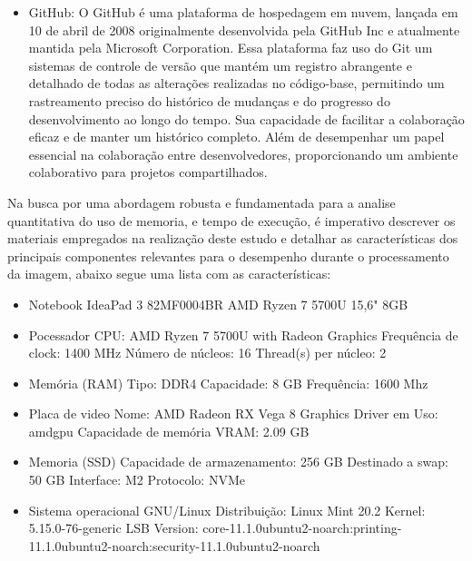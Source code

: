 \begin{itemize}
    \item GitHub: O GitHub é uma plataforma de hospedagem em nuvem, lançada em 10 de abril de 2008 originalmente desenvolvida pela GitHub Inc e atualmente mantida pela Microsoft Corporation. Essa plataforma faz uso do Git um sistemas de controle de versão que mantém um registro abrangente e detalhado de todas as alterações realizadas no código-base, permitindo um rastreamento preciso do histórico de mudanças e do progresso do desenvolvimento ao longo do tempo. Sua capacidade de facilitar a colaboração eficaz e de manter um histórico completo. Além de desempenhar um papel essencial na colaboração entre desenvolvedores, proporcionando um ambiente colaborativo para projetos compartilhados\cite{github}.

 \end{itemize}

Na busca por uma abordagem robusta e fundamentada para a analise quantitativa do uso de memoria, e tempo de execução, é imperativo descrever os materiais empregados na realização deste estudo e detalhar as características dos principais componentes relevantes para o desempenho durante o processamento da imagem, abaixo segue uma lista com as características:

\begin{itemize}

\item Notebook IdeaPad 3 82MF0004BR AMD Ryzen 7 5700U 15,6" 8GB 

\item Pocessador
\subitem CPU: AMD Ryzen 7 5700U with Radeon Graphics
\subitem Frequência de clock: 1400 MHz
\subitem Número de núcleos: 16
\subitem Thread(s) per núcleo: 2

\item Memória (RAM)
\subitem Tipo: DDR4
\subitem Capacidade: 8 GB
\subitem Frequência: 1600 Mhz

\item Placa de video
\subitem Nome: AMD Radeon RX Vega 8 Graphics
\subitem Driver em Uso: amdgpu
\subitem Capacidade de memória VRAM: 2.09 GB

\item Memoria (SSD)
\subitem Capacidade de armazenamento: 256 GB
\subitem Destinado a swap: 50 GB
\subitem Interface: M2
\subitem Protocolo: NVMe

\item Sistema operacional GNU/Linux
\subitem Distribuição: Linux Mint 20.2
\subitem Kernel: 5.15.0-76-generic
\subitem LSB Version: core-11.1.0ubuntu2-noarch:printing-11.1.0ubuntu2-noarch:security-11.1.0ubuntu2-noarch




\end{itemize}


